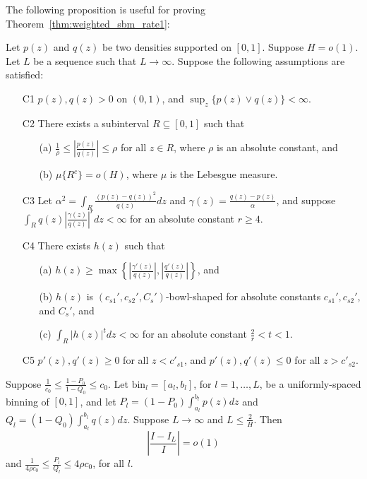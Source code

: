 \documentclass{article}
\newcommand{\bin}{\text{bin}}
\begin{document}
\noindent The following proposition is useful for proving Theorem~\ref{thm:weighted_sbm_rate1}:
\begin{proposition} 
\label{prop:discretization1}
Let $p(z)$ and $q(z)$ be two densities supported on $[0,1]$. Suppose $H = o(1)$. Let $L$ be a sequence such that $L \rightarrow \infty$. Suppose the following assumptions are satisfied:
\begin{enumerate}
\item[C1] $p(z), q(z) > 0$ on $(0, 1)$, and $\sup_z \{p(z) \vee q(z)\} < \infty$. 
\item[C2] There exists a subinterval $R \subseteq [0,1]$ such that
\begin{itemize}
\item[(a)] $\frac{1}{\rho} \leq \left| \frac{p(z)}{q(z)} \right| \leq \rho$ for all $z \in R$, where $\rho$ is an absolute constant, and
\item[(b)] $\mu\{R^c\} = o(H)$, where $\mu$ is the Lebesgue measure.
\end{itemize}
\item[C3] Let $\alpha^2 = \int_R \frac{(p(z) - q(z))^2}{q(z)} dz$ and $\gamma(z) = \frac{q(z) - p(z)}{\alpha}$, and suppose $\int_R q(z) \left| \frac{\gamma(z)}{q(z)} \right|^r dz  < \infty$ for an absolute constant $r \geq 4$.
\item[C4] There exists $h(z)$ such that
\begin{itemize}
\item[(a)] $h(z) \geq \max \left\{  \left|\frac{\gamma'(z)}{q(z)} \right|, \left|\frac{q'(z)}{q(z)}\right|  \right\}$, and
\item[(b)] $h(z)$ is $(c_{s1}', c_{s2}', C_s')$-bowl-shaped for absolute constants $c_{s1}', c_{s2}'$, and $C_s'$, and
\item[(c)] $\int_R |h(z)|^t dz < \infty$ for an absolute constant $\frac{2}{r} < t < 1$.
\end{itemize}
\item[C5] $p'(z), q'(z) \geq 0$ for all $z < c'_{s1}$, and $p'(z), q'(z) \leq 0$ for all $z > c'_{s2}$.
\end{enumerate}

Suppose $\frac{1}{c_0} \leq \frac{1 - P_0}{1-Q_0} \leq c_0$. Let $\bin_l = [a_l, b_l]$, for $l=1, \dots, L$, be a uniformly-spaced binning of $[0,1]$, and let $P_l = (1- P_0) \int_{a_l}^{b_l} p(z) dz$ and $Q_l = (1-Q_0)\int_{a_l}^{b_l} q(z) dz$. Suppose $L \rightarrow \infty$ and $L \leq \frac{2}{H}$.
Then
 $$\left| \frac{I - I_L}{I} \right| = o(1)$$ 
and $\frac{1}{4\rho c_0} \leq \frac{P_l}{Q_l} \leq 4\rho c_0$, for all $l$. 
\end{proposition}
\end{document}
